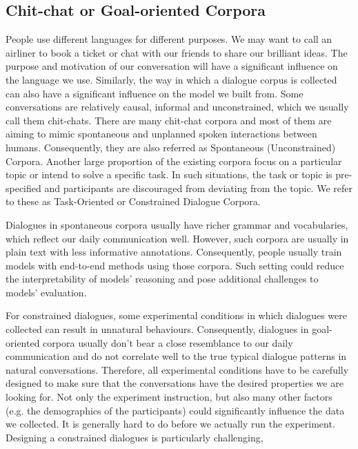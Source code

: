 \documentclass[bsc,frontabs,twoside,singlespacing,parskip,deptreport]{infthesis}     %
\begin{document}
\subsection{Chit-chat or Goal-oriented Corpora}

People use different languages for different purposes. We may want to call an airliner to book a ticket or chat with our friends to share our brilliant ideas. The purpose and motivation of our conversation will have a significant influence on the language we use. Similarly, the way in which a dialogue corpus is collected can also have a significant influence on the model we built from. Some conversations are relatively causal, informal and unconstrained, which we usually call them chit-chats. There are many chit-chat corpora and most of them are aiming to mimic spontaneous and unplanned spoken interactions between humans. Consequently, they are also referred as Spontaneous (Unconstrained) Corpora\cite{serban2018survey}. Another large proportion of the existing corpora focus on a particular topic or intend to solve a specific task. In such situations, the task or topic is pre-specified and participants are discouraged from deviating from the topic. We refer to these as Task-Oriented or Constrained Dialogue Corpora.

Dialogues in spontaneous corpora usually have richer grammar and vocabularies, which reflect our daily communication well. However, such corpora are usually in plain text with less informative annotations. Consequently, people usually train models with end-to-end methods using those corpora. Such setting could reduce the interpretability of models' reasoning and pose additional challenges to models' evaluation.

For constrained dialogues, some experimental conditions in which dialogues were collected can result in unnatural behaviours. Consequently, dialogues in goal-oriented corpora usually don't bear a close resemblance to our daily communication and do not correlate well to the true typical dialogue patterns in natural conversations. Therefore, all experimental conditions have to be carefully designed to make sure that the conversations have the desired properties we are looking for. Not only the experiment instruction, but also many other factors (e.g. the demographics of the participants\cite{ai2007comparing,young2013pomdp}) could significantly influence the data we collected. It is generally hard to do before we actually run the experiment. Designing a constrained dialogues is particularly challenging, 
\end{document}
